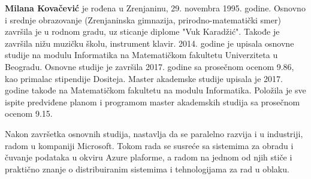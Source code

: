 \documentclass[12pt,oneside]{memoir}
\begin{document}
\backmatter

\begin{biografija}
  \textbf{Milana Kovačević} je rođena u Zrenjaninu, 29. novembra 1995. godine. Osnovno i srednje obrazovanje (Zrenjaninska gimnazija, prirodno-matematički smer) završila je u rodnom gradu, uz sticanje diplome "Vuk Karadžić". Takođe je završila nižu muzičku školu, instrument klavir.
2014. godine je upisala osnovne studije na modulu Informatika na Matematičkom fakultetu Univerziteta u Beogradu. Osnovne studije je završila 2017. godine sa prosečnom ocenom 9.86, kao primalac stipendije Dositeja. Master akademske studije upisala je 2017. godine takođe na Matematičkom fakultetu na modulu Informatika. Položila je sve ispite predviđene planom i programom master akademskih studija sa prosečnom ocenom 9.15.

Nakon završetka osnovnih studija, nastavlja da se paralelno razvija i u industriji, radom u kompaniji Microsoft. Tokom rada se susreće sa sistemima za obradu i čuvanje podataka u okviru Azure plaforme, a radom na jednom od njih stiče i praktično znanje o distribuiranim sistemima i tehnologijama za rad u oblaku.

\end{biografija}
\end{document}
